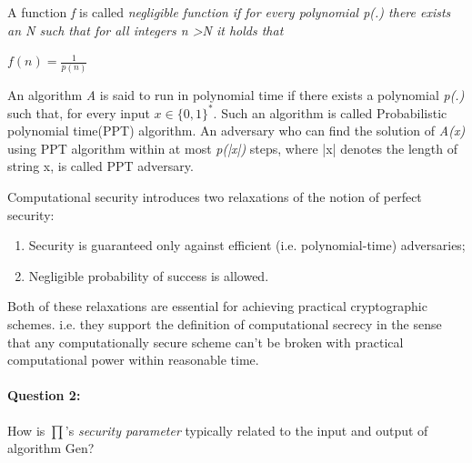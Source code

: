 \documentclass{article}
\begin{document}
        \begin{flushleft}
            A function \emph{f} is called \emph{negligible function} \emph{if for every polynomial p(.) there exists an N such that for all integers n \textgreater N it holds that}
            \begin{center}
                $
                    f(n) = \frac{1}{p(n)}
                $
            \end{center}
            
            An algorithm \emph{A} is said to run in polynomial time if there exists a polynomial \emph{p(.)} such that, for every input 
                $
                    x\in\{0,1\}^*
                $.
            Such an algorithm is called Probabilistic polynomial time(PPT) algorithm.
            An adversary who can find the solution of \emph{A(x)} using PPT algorithm within at most \emph{p(|x|)} steps, where |x| denotes the length of string x, is called PPT adversary. \newline
            
            Computational security introduces two relaxations of the notion of perfect security:
            \begin{enumerate}
                \item Security is guaranteed only against  efficient (i.e. polynomial-time) adversaries;
                \item Negligible probability of success is allowed.
            \end{enumerate}
            Both of these relaxations are essential for achieving practical cryptographic schemes. i.e. they support the definition of computational secrecy in the sense that any computationally secure scheme can't be broken with practical computational power within reasonable time.
        \end{flushleft}
    
    \paragraph{Question 2:} How is $\prod$'s \emph{security parameter} typically related to the input and output of algorithm Gen?
    
\end{document}

